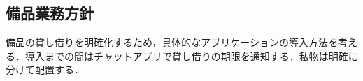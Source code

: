 \subsection*{備品業務方針}

備品の貸し借りを明確化するため，具体的なアプリケーションの導入方法を考える．導入までの間はチャットアプリで貸し借りの期限を通知する．私物は明確に分けて配置する．
